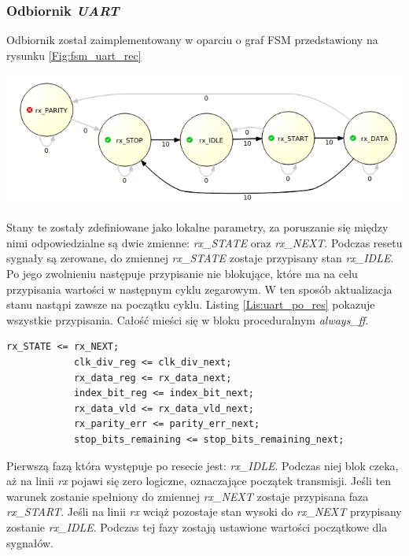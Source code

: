 \documentclass[11pt,a4paper]{article}
\begin{document}
	\subsubsection{Odbiornik \textit{UART}}
	Odbiornik został zaimplementowany w oparciu o graf FSM przedstawiony na rysunku \ref{Fig:fsm_uart_rec} \\
			\begin{minipage}[c]{\textwidth}
					\includegraphics[width=\textwidth]{./rysunki/uart_fsm_rec.png}
			\end{minipage} 
			Stany te zostały zdefiniowane jako lokalne parametry, za poruszanie się między nimi odpowiedzialne są dwie zmienne: \textit{rx\_STATE} oraz \textit{rx\_NEXT}. Podczas resetu sygnały są zerowane, do zmiennej \textit{rx\_STATE} zostaje przypisany stan \textit{rx\_IDLE}. Po jego zwolnieniu następuje przypisanie nie blokujące, które ma na celu przypisania wartości w następnym cyklu zegarowym. W ten sposób aktualizacja stanu nastąpi zawsze na początku cyklu. Listing \ref{Lis:uart_po_res} pokazuje wszystkie przypisania. Całość mieści się w bloku proceduralnym \textit{always\_ff}.\\
\begin{minipage}{\textwidth}
\begin{scriptsize}
\begin{lstlisting}[label=Lis:uart_po_res,caption=Odbiornik \textit{UART} po resecie]
			rx_STATE <= rx_NEXT;
			clk_div_reg <= clk_div_next;
			rx_data_reg <= rx_data_next;
			index_bit_reg <= index_bit_next;
			rx_data_vld <= rx_data_vld_next;
			rx_parity_err <= parity_err_next;
			stop_bits_remaining <= stop_bits_remaining_next;
\end{lstlisting}
\end{scriptsize}
\end{minipage}	
Pierwszą fazą która występuje po resecie jest: \textit{rx\_IDLE}. Podczas niej blok czeka, aż na linii \textit{rx} pojawi się zero logiczne, oznaczające początek transmisji. Jeśli ten warunek zostanie spełniony do zmiennej \textit{rx\_NEXT} zostaje przypisana faza \textit{rx\_START}. Jeśli na linii \textit{rx} wciąż pozostaje stan wysoki do \textit{rx\_NEXT} przypisany zostanie \textit{rx\_IDLE}. Podczas tej fazy zostają ustawione wartości początkowe dla sygnałów.\\
\end{document}
